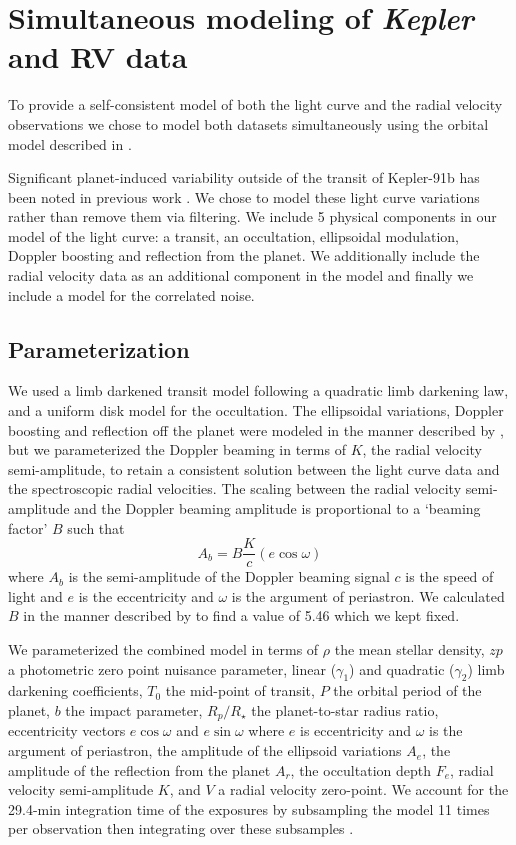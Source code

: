 \documentclass[apjl]{emulateapj}
\begin{document}
\section{Simultaneous modeling of \emph{Kepler} and RV data}
To provide a self-consistent model of both the light curve and the radial velocity observations we chose to model both datasets simultaneously using the orbital model described in \citet{rowe14}.

Significant planet-induced variability outside of the transit of Kepler-91b has been noted in previous work \citep{lillo14,esteves13}. We chose to model these light curve variations rather than remove them via filtering.  We include 5 physical components in our model of the light curve: a transit, an occultation, ellipsoidal modulation, Doppler boosting and reflection from the planet. We additionally include the radial velocity data as an additional component in the model and finally we include a model for the correlated noise.


\subsection{Parameterization}
We used a limb darkened transit model \citep{mandel02} following a quadratic limb darkening law, and a uniform disk model for the occultation.  The ellipsoidal variations, Doppler boosting and reflection off the planet were modeled in the manner described by \citet{lillo14}, but we parameterized the Doppler beaming in terms of $K$, the radial velocity semi-amplitude, to retain a consistent solution between the light curve data and the spectroscopic radial velocities. The scaling between the radial velocity semi-amplitude and the Doppler beaming amplitude is proportional to a `beaming factor' $B$ such that
\begin{equation}
A_b = B \frac{K}{c} (e\cos{\omega})
\end{equation}
where $A_b$ is the semi-amplitude of the Doppler beaming signal $c$ is the speed of light and $e$ is the eccentricity and $\omega$ is the argument of periastron. We calculated $B$ in the manner described by \citet{bloemen11} to find a value of 5.46 which we kept fixed. 

We parameterized the combined model in terms of $\rho$ the mean stellar density, $zp$ a photometric zero point nuisance parameter, linear ($\gamma_1$) and quadratic ($\gamma_2$) limb darkening coefficients, $T_0$ the mid-point of transit, $P$ the orbital period of the planet, $b$ the impact parameter, $R_{p}/R_{\star}$ the planet-to-star radius ratio, eccentricity vectors $e\cos{\omega}$ and $e\sin{\omega}$ where $e$ is eccentricity and $\omega$ is the argument of periastron, the amplitude of the ellipsoid variations $A_e$, the amplitude of the reflection from the planet $A_r$, the occultation depth $F_e$, radial velocity semi-amplitude $K$, and $V$ a radial velocity zero-point. We account for the 29.4-min integration time of the exposures by subsampling the model 11 times per observation then integrating over these subsamples \citep{kipping10}.
\end{document}
